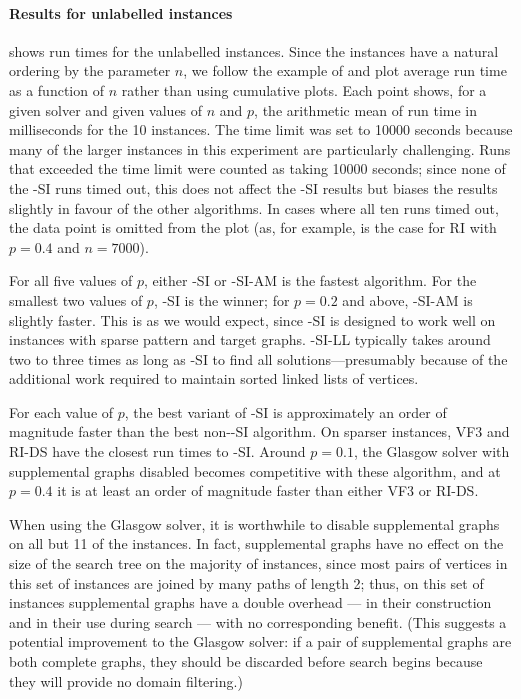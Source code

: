 \paragraph*{Results for unlabelled instances}

 shows run times for the unlabelled instances.
Since the instances have a natural ordering by the parameter $n$, we follow the example
of \cite{DBLP:journals/pami/CarlettiFSV18} and plot average run time as a function of $n$
rather than using cumulative plots.
Each point shows, for a given solver and given values of $n$ and $p$, the arithmetic mean of
run time in milliseconds for the 10 instances.
The time limit was set to 10000 seconds because many of the larger instances in this experiment
are particularly challenging.  Runs that exceeded the time limit were counted as taking 10000 seconds;
since none of the \McSplit-SI runs timed out, this does not affect the \McSplit-SI results but biases
the results slightly in favour of the other algorithms.  In cases where all ten runs timed out,
the data point is omitted from the plot (as, for example,  is the case for RI with $p=0.4$ and $n=7000$).

For all five values of $p$, either \McSplit-SI or \McSplit-SI-AM is the fastest algorithm.  For
the smallest two values of $p$, \McSplit-SI is the winner; for $p=0.2$ and above, \McSplit-SI-AM
is slightly faster.  This is as we would expect, since \McSplit-SI is designed to work well
on instances with sparse pattern and target graphs.  
\McSplit-SI-LL typically takes around two to three times as long as \McSplit-SI to find all
solutions---presumably because of the additional work required to maintain sorted linked
lists of vertices.

For each value of $p$, the best variant of \McSplit-SI
is approximately an order of magnitude faster than the best non-\McSplit-SI algorithm.
On sparser instances, VF3 and RI-DS have the closest run times to \McSplit-SI.  Around $p=0.1$,
the Glasgow solver with supplemental graphs disabled becomes competitive with these algorithm, and at $p=0.4$
it is at least an order of magnitude faster than either VF3 or RI-DS.

When using the Glasgow solver, it is worthwhile to disable supplemental graphs
on all but 11 of the instances.  In fact, supplemental graphs have no effect on
the size of the search tree on the majority of instances, since most pairs of
vertices in this set of instances are joined by many paths of length 2; thus,
on this set of instances supplemental graphs have a double overhead --- in
their construction and in their use during search --- with no corresponding
benefit.  (This suggests a potential improvement to the Glasgow solver:
if a pair of supplemental graphs are both complete graphs, they should be
discarded before search begins because they will provide no domain filtering.)

